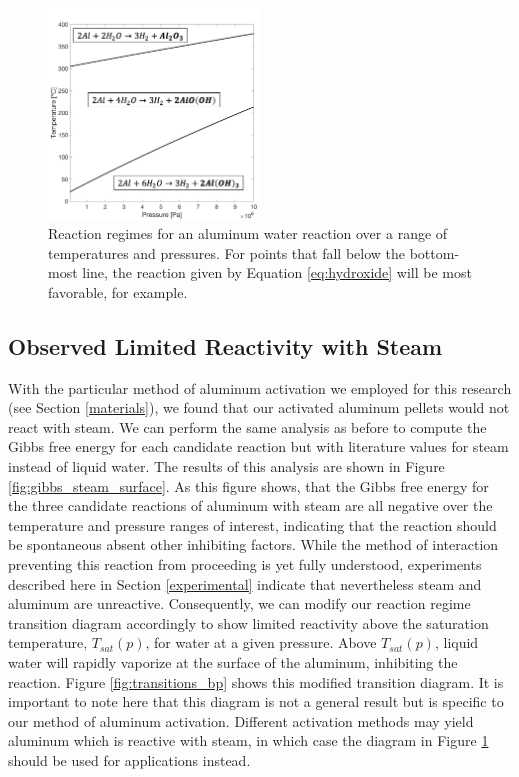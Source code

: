 \documentclass[preprint,12pt,3p]{elsarticle}
\begin{document}
\begin{figure}
  \centering
  \includegraphics[width=0.5\textwidth]{fig/transitions}
  \caption{Reaction regimes for an aluminum water reaction over a range of
  temperatures and pressures. For points that fall below the bottom-most line,
the reaction given by Equation \ref{eq:hydroxide} will be most favorable, for
example.}
  \label{fig:transitions}
\end{figure}

\subsection{Observed Limited Reactivity with Steam}

With the particular method of aluminum activation we employed for this research
(see Section \ref{materials}), we found that our activated aluminum pellets
would not react with steam. We can perform the same analysis as before to
compute the Gibbs free energy for each candidate reaction but with literature
values for steam instead of liquid water. The results of this analysis are shown
in Figure \ref{fig:gibbs_steam_surface}. As this figure shows, that the Gibbs
free energy for the three candidate reactions of aluminum with steam are all
negative over the temperature and pressure ranges of interest, indicating that
the reaction should be spontaneous absent other inhibiting factors. While the
method of interaction preventing this reaction from proceeding is yet fully
understood, experiments described here in Section \ref{experimental} indicate
that nevertheless steam and aluminum are unreactive. Consequently, we can modify
our reaction regime transition diagram accordingly to show limited reactivity
above the saturation temperature, $T_{sat}(p)$, for water at a given pressure.
Above $T_{sat}(p)$, liquid water will rapidly vaporize at the surface of the
aluminum, inhibiting the reaction. Figure \ref{fig:transitions_bp} shows this
modified transition diagram. It is important to note here that this diagram is
not a general result but is specific to our method of aluminum activation.
Different activation methods may yield aluminum which is reactive with steam, in
which case the diagram in Figure \ref{fig:transitions} should be used for
applications instead.
\end{document}

